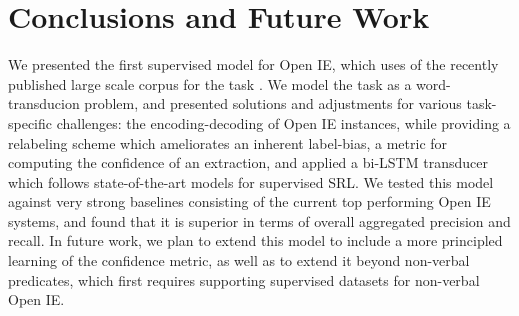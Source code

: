 \documentclass[11pt,a4paper]{article}
\begin{document}
\section{Conclusions and Future Work}
\label{sec:conclusions}
We presented the first supervised model for Open IE,
which uses of the recently published large scale corpus for the task \cite{Stanovsky2016EMNLP}.
We model the task as a word-transducion problem, and presented solutions and
adjustments for various task-specific challenges: the encoding-decoding of Open IE instances, while providing a relabeling scheme which ameliorates an inherent label-bias, a metric for computing the confidence of an extraction,
and applied a bi-LSTM transducer which follows state-of-the-art models for supervised SRL.
We tested this model against very strong baselines consisting of the current top performing Open IE systems, and
found that it is superior in terms of overall aggregated precision and recall.
In future work, we plan to extend this model to include a more principled learning of the confidence metric,
as well as to extend it beyond non-verbal predicates, which first requires supporting supervised
datasets for non-verbal Open IE.

%
%


\end{document}

